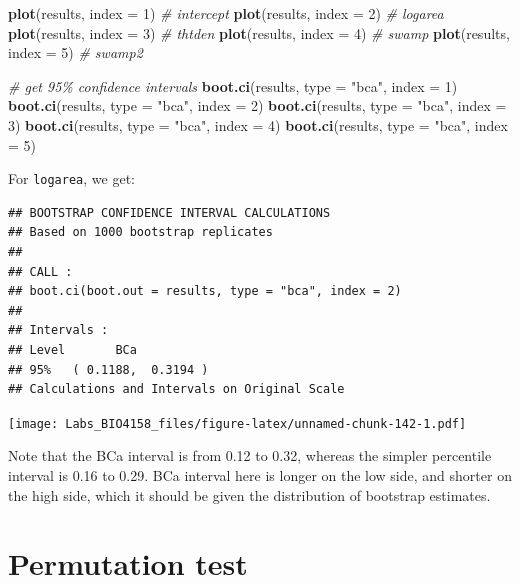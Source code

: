\documentclass[
  12pt,
]{book}
\newenvironment{Shaded}{\begin{snugshade}}{\end{snugshade}}
\newcommand{\CommentTok}[1]{\textcolor[rgb]{0.56,0.35,0.01}{\textit{#1}}}
\newcommand{\DataTypeTok}[1]{\textcolor[rgb]{0.13,0.29,0.53}{#1}}
\newcommand{\DecValTok}[1]{\textcolor[rgb]{0.00,0.00,0.81}{#1}}
\newcommand{\KeywordTok}[1]{\textcolor[rgb]{0.13,0.29,0.53}{\textbf{#1}}}
\newcommand{\NormalTok}[1]{#1}
\newcommand{\StringTok}[1]{\textcolor[rgb]{0.31,0.60,0.02}{#1}}
\begin{document}
\begin{Shaded}
\begin{Highlighting}[]
\KeywordTok{plot}\NormalTok{(results, }\DataTypeTok{index =} \DecValTok{1}\NormalTok{) }\CommentTok{\# intercept}
\KeywordTok{plot}\NormalTok{(results, }\DataTypeTok{index =} \DecValTok{2}\NormalTok{) }\CommentTok{\# logarea}
\KeywordTok{plot}\NormalTok{(results, }\DataTypeTok{index =} \DecValTok{3}\NormalTok{) }\CommentTok{\# thtden}
\KeywordTok{plot}\NormalTok{(results, }\DataTypeTok{index =} \DecValTok{4}\NormalTok{) }\CommentTok{\# swamp}
\KeywordTok{plot}\NormalTok{(results, }\DataTypeTok{index =} \DecValTok{5}\NormalTok{) }\CommentTok{\# swamp2}

\CommentTok{\# get 95\% confidence intervals}
\KeywordTok{boot.ci}\NormalTok{(results, }\DataTypeTok{type =} \StringTok{"bca"}\NormalTok{, }\DataTypeTok{index =} \DecValTok{1}\NormalTok{)}
\KeywordTok{boot.ci}\NormalTok{(results, }\DataTypeTok{type =} \StringTok{"bca"}\NormalTok{, }\DataTypeTok{index =} \DecValTok{2}\NormalTok{)}
\KeywordTok{boot.ci}\NormalTok{(results, }\DataTypeTok{type =} \StringTok{"bca"}\NormalTok{, }\DataTypeTok{index =} \DecValTok{3}\NormalTok{)}
\KeywordTok{boot.ci}\NormalTok{(results, }\DataTypeTok{type =} \StringTok{"bca"}\NormalTok{, }\DataTypeTok{index =} \DecValTok{4}\NormalTok{)}
\KeywordTok{boot.ci}\NormalTok{(results, }\DataTypeTok{type =} \StringTok{"bca"}\NormalTok{, }\DataTypeTok{index =} \DecValTok{5}\NormalTok{)}
\end{Highlighting}
\end{Shaded}

For \texttt{logarea}, we get:

\begin{verbatim}
## BOOTSTRAP CONFIDENCE INTERVAL CALCULATIONS
## Based on 1000 bootstrap replicates
## 
## CALL : 
## boot.ci(boot.out = results, type = "bca", index = 2)
## 
## Intervals : 
## Level       BCa          
## 95%   ( 0.1188,  0.3194 )  
## Calculations and Intervals on Original Scale
\end{verbatim}

\texttt{[image: Labs\_BIO4158\_files/figure-latex/unnamed-chunk-142-1.pdf]}

Note that the BCa interval is from 0.12 to 0.32, whereas the simpler percentile interval is 0.16 to 0.29. BCa interval here is longer on the low side, and shorter on the high side, which it should be given the distribution of bootstrap estimates.

\hypertarget{permutation-test-1}{%
\section{Permutation test}\label{permutation-test-1}}
\end{document}
